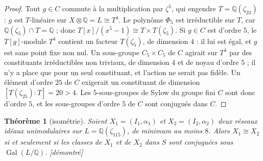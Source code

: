 \documentclass[11pt,a4paper]{amsart}
\theoremstyle{plain}
\newtheorem{theoreme}{Théorème}[section]
\theoremstyle{definition}
\numberwithin{equation}{section}
\newcommand{\Q}{\mathbb{Q}}
\DeclareMathOperator{\Gal}{Gal}
\newcommand{\st}[1]{\textup{\textsf{\small[#1]}}}
\newcommand{\DEM}{\st{démontré}}
\begin{document}
\begin{proof}
Tout $g\in C$ commute à la multiplication par $\zeta^5$, qui engendre $T=\Q(\zeta_{23})$ : $g$ est $T$-linéaire sur $X\otimes\Q=L\cong T^4$. Le polynôme $\Phi_5$ est irréductible sur $T$, car $\Q(\zeta_5)\cap T=\Q$ ; donc $T[x]/(x^5-1)\cong T\times T(\zeta_5)$. Si $g\in C$ est d'ordre $5$, le $T[g]$-module $T^4$ contient un facteur $T(\zeta_5)$, de dimension $4$ : il lui est égal, et $g$ est sans point fixe non nul. Un sous-groupe $C_5\times C_5$ de $C$ agirait sur $T^4$ par des constituants irréductibles non triviaux, de dimension $4$ et de noyau d'ordre $5$ ; il n'y a place que pour un seul constituant, et l'action ne serait pas fidèle. Un élément d'ordre $25$ de $C$ exigerait un constituant de dimension $[T(\zeta_{25}):T]=20>4$. Les $5$-sous-groupes de Sylow du groupe fini $C$ sont donc d'ordre $5$, et les sous-groupes d'ordre $5$ de $C$ sont conjugués dans $C$.
\end{proof}

\begin{theoreme}[isométrie]\label{thm:isometrie}
Soient $X_1=(I_1,\alpha_1)$ et $X_2=(I_2,\alpha_2)$ deux réseaux idéaux unimodulaires sur $L=\Q(\zeta_{115})$, de minimum au moins $8$. Alors $X_1\cong X_2$ si et seulement si les classes de $X_1$ et de $X_2$ dans $S$ sont conjuguées sous $\Gal(L/\Q)$. \DEM
\end{theoreme}
\end{document}
